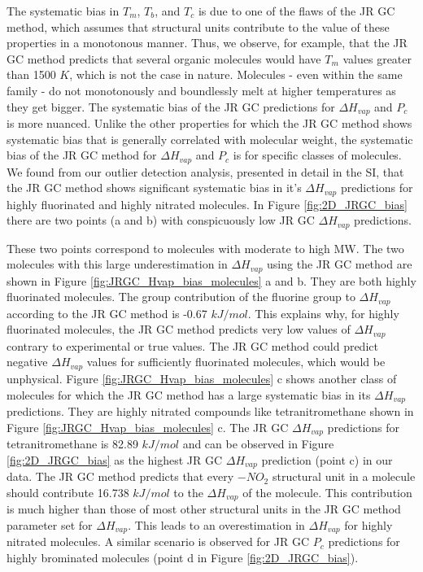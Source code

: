 \documentclass[journal=jacsat,manuscript=article, ]{achemso}
\begin{document}
The systematic bias in  $T_m$, $T_b$, and $T_c$ is due to one of the flaws of the JR GC method, which assumes that structural units contribute to the value of these properties in a monotonous manner. 
Thus, we observe, for example, that the JR GC method predicts that several organic molecules would have $T_m$ values greater than 1500 $K$, which is not the case in nature. Molecules - even within the same family - do not monotonously and boundlessly melt at higher temperatures as they get bigger.
The systematic bias of the JR GC predictions for $\Delta H_{vap}$ and $P_c$ is more nuanced. Unlike the other properties for which the JR GC method shows systematic bias that is generally correlated with molecular weight, the systematic bias of the JR GC method for $\Delta H_{vap}$ and $P_c$ is for specific classes of molecules.
We found from our outlier detection analysis, presented in detail in the SI, that the JR GC method shows significant systematic bias in it's $\Delta H_{vap}$ predictions for highly fluorinated and highly nitrated molecules. In Figure \ref{fig:2D_JRGC_bias} there are two points (a and b) with conspicuously low JR GC $\Delta H_{vap}$ predictions.

These two points correspond to molecules with moderate to high MW. The two molecules with this large underestimation in  $\Delta H_{vap}$ using the JR GC method are shown in Figure \ref{fig:JRGC_Hvap_bias_molecules} a and b. They are both highly fluorinated molecules. 
The group contribution of the fluorine group to $\Delta H_{vap}$ according to the JR GC method is -0.67 $kJ/mol$. 
This explains why, for highly fluorinated molecules, the JR GC method predicts very low values of $\Delta H_{vap}$ contrary to experimental or true values. 
The JR GC method could predict negative $\Delta H_{vap}$ values for sufficiently fluorinated molecules, which would be unphysical. 
Figure \ref{fig:JRGC_Hvap_bias_molecules} c shows another class of molecules for which the JR GC method has a large systematic bias in its $\Delta H_{vap}$ predictions. They are highly nitrated compounds like tetranitromethane shown in Figure \ref{fig:JRGC_Hvap_bias_molecules} c. 
The JR GC $\Delta H_{vap}$ predictions for tetranitromethane is 82.89 $kJ/mol$ and can be observed in Figure \ref{fig:2D_JRGC_bias} as the highest JR GC $\Delta H_{vap}$ prediction (point c) in our data. 
The JR GC method predicts that every $-NO_2$ structural unit in a molecule should contribute 16.738 $kJ/mol$ to the $\Delta H_{vap}$ of the molecule. 
This contribution is much higher than those of most other structural units in the JR GC method parameter set for $\Delta H_{vap}$. This leads to an overestimation in $\Delta H_{vap}$ for highly nitrated molecules.
A similar scenario is observed for JR GC $P_c$ predictions for highly brominated molecules (point d in Figure \ref{fig:2D_JRGC_bias}).  
\end{document}
